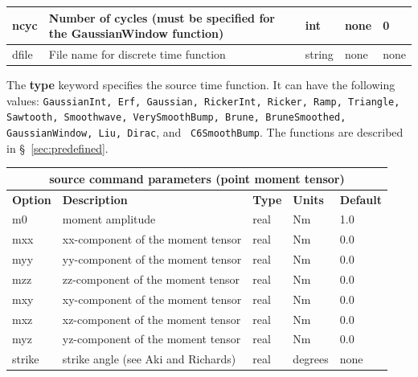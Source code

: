 \documentclass[11pt]{report}
\begin{document}
{\begin{center}
\begin{tabular}{|l|p{8cm}|l|l|l|}
		ncyc        & Number of cycles (must be specified for the GaussianWindow function) & int       & none        & 0
		\\ \hline
		dfile       & File name for discrete time function                                 & string    & none        & none         \\ \hline
	\end{tabular}
\end{center}
The {\bf type} keyword specifies the source time function. It can have
the following values: {\tt GaussianInt, Erf, Gaussian, RickerInt, Ricker, Ramp, Triangle, Sawtooth,
Smoothwave, VerySmoothBump, Brune, BruneSmoothed, GaussianWindow, Liu, Dirac}, and {\tt
		C6SmoothBump}. The functions are described in \S~\ref{sec:predefined}.
\begin{center}
	\begin{tabular}{|l|p{8cm}|l|l|l|} \hline
		\multicolumn{5}{|c|}{\bf source command parameters (point moment tensor)}                 \\ \hline
		\bf{Option} & \bf{Description}                    & \bf{Type} & \bf{Units} & \bf{Default} \\ \hline \hline
		m0          & moment amplitude                    & real      & Nm         & 1.0          \\ \hline
		mxx         & xx-component of the moment tensor   & real      & Nm         & 0.0          \\ \hline
		myy         & yy-component of the moment tensor   & real      & Nm         & 0.0          \\ \hline
		mzz         & zz-component of the moment tensor   & real      & Nm         & 0.0          \\ \hline
		mxy         & xy-component of the moment tensor   & real      & Nm         & 0.0          \\ \hline
		mxz         & xz-component of the moment tensor   & real      & Nm         & 0.0          \\ \hline
		myz         & yz-component of the moment tensor   & real      & Nm         & 0.0          \\ \hline
		\hline
		strike      & strike angle (see Aki and Richards) & real      & degrees    & none         \\ \hline

\end{tabular}
\end{center}}
\end{document}

